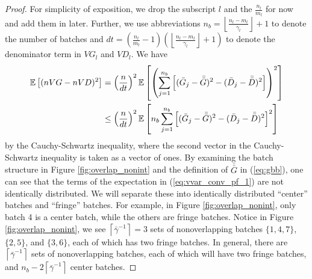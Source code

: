 \documentclass[12pt]{article}
\newcommand{\e}[1]{\mathbb{E} \left[ #1 \right]
}
\newcommand{\nbl}{\left\lfloor\tfrac{n_l-m_l}{\gamma_l}\right\rfloor+1}
\newcommand{\gammab}{\bar{\gamma}}
\newcommand{\gb}{\bar{G}}
\newcommand{\gbb}{\bar{\gb}}
\newcommand{\db}{\bar{D}}
\newcommand{\dbb}{\bar{\db}}
\begin{document}
\begin{proof}
	For simplicity of exposition, we drop the subscript $l$ and the $\frac{n_l}{m_l}$ for now and add them in later.  
        Further, we use abbreviations $n_b = \nbl$ to denote the number of batches and $dt = \left(\tfrac{n_l}{m_l} - 1\right) \left(\nbl\right)$ to denote the denominator term in $VG_l$ and $VD_l$. We have
	\begin{align}
		\e{(nVG - nVD)^2} & = \left( \frac{n}{dt} \right)^2 \e{ \left( \sum_{j=1}^{n_b} \left[ (\gb_j - \gbb)^2 - (\db_j - \dbb)^2 \right] \right)^2 } \notag \\
		& \leq \left( \frac{n}{dt} \right)^2 \e{ n_b \sum_{j=1}^{n_b} \left[ (\gb_j - \gbb)^2 - (\db_j - \dbb)^2 \right]^2 } \label{eq:vvar_conv_pf_1}
	\end{align}
	by the Cauchy-Schwartz inequality, where the second vector in the Cauchy-Schwartz inequality is taken as a vector of ones.  
        By examining the batch structure in Figure \ref{fig:overlap_nonint} and the definition of $\gbb$ in (\ref{eq:gbb}), one can see that the terms of the expectation in (\ref{eq:vvar_conv_pf_1}) are not identically distributed.  
        We will separate these into identically distributed ``center'' batches and ``fringe'' batches.  
        For example, in Figure \ref{fig:overlap_nonint}, only batch 4 is a center batch, while the others are fringe batches.  
        Notice in Figure \ref{fig:overlap_nonint}, we see $\left\lceil \gammab^{-1} \right\rceil = 3$ sets of nonoverlapping batches $\{1,4,7\}$, $\{2,5\}$, and $\{3,6\}$, each of which has two fringe batches.  
        In general, there are $\left\lceil \gammab^{-1} \right\rceil$ sets of nonoverlapping batches, each of which will have two fringe batches, and $n_b - 2\left\lceil \gammab^{-1} \right\rceil$ center batches.
	

\end{proof}
\end{document}
